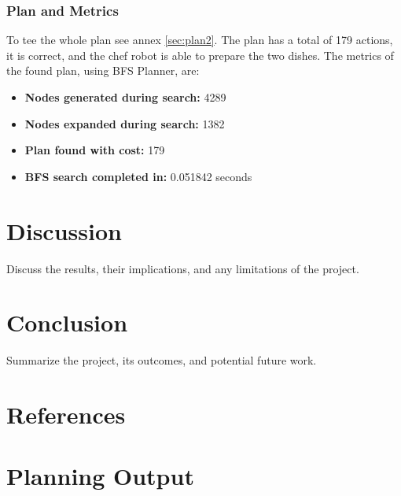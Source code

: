 \documentclass[a4paper,12pt]{article}
\begin{document}
\subsubsection{Plan and Metrics}
To tee the whole plan see annex \ref{sec:plan2}. The plan has a total of 179 actions, it is correct, and the chef robot is able to prepare the two dishes. The metrics of the found plan, using BFS Planner, are:

\begin{itemize}
    \item \textbf{Nodes generated during search:} 4289
    \item \textbf{Nodes expanded during search:} 1382
    \item \textbf{Plan found with cost:} 179
    \item \textbf{BFS search completed in:} 0.051842 seconds
\end{itemize}


\section{Discussion}
\label{sec:discussion}
Discuss the results, their implications, and any limitations of the project.

\section{Conclusion}
\label{sec:conclusion}
Summarize the project, its outcomes, and potential future work.

\section{References}
\label{sec:references}



\appendix
\section{Planning Output}
\end{document}
